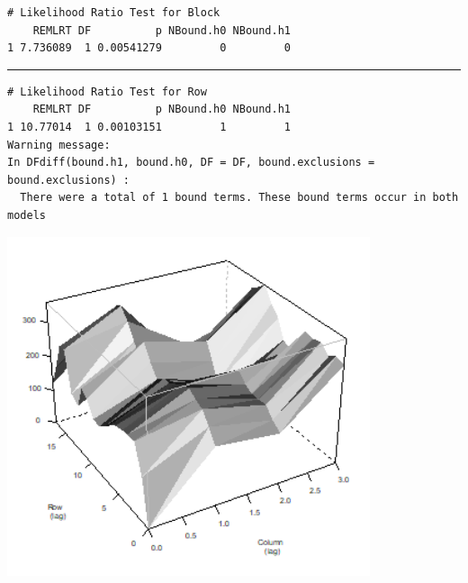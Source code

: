\documentclass[a4paper, 10pt, fleqn, twosided]{memoir}
\begin{document}
\begin{tcolorbox}[title = Exercise 15 output]
\begin{verbatim}
# Likelihood Ratio Test for Block
    REMLRT DF          p NBound.h0 NBound.h1
1 7.736089  1 0.00541279         0         0
\end{verbatim}

{\color{outpt} {\hrule height 1pt}}

\begin{verbatim}
# Likelihood Ratio Test for Row
    REMLRT DF          p NBound.h0 NBound.h1
1 10.77014  1 0.00103151         1         1
Warning message:
In DFdiff(bound.h1, bound.h0, DF = DF, bound.exclusions = bound.exclusions) :
  There were a total of 1 bound terms. These bound terms occur in both models
\end{verbatim}
\includegraphics[width=0.8\textwidth, frame]{Exercise15Vario.png}

\end{tcolorbox}
\end{document}
